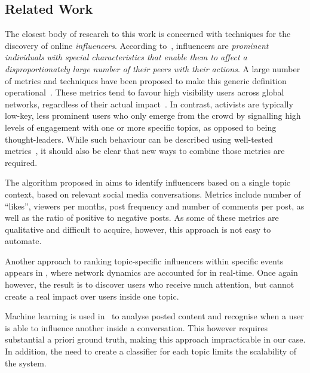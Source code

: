 \subsection{Related Work}  \label{sec:related}

The closest body of research to this work is concerned with techniques for the discovery of online \textit{influencers}. 
According to~\cite{Kardara2015}, influencers are \textit{prominent individuals with special characteristics that enable them to	affect a disproportionately large number of their peers with their actions}.
%
A large number of metrics and techniques have been proposed to make this generic definition operational~\cite{RIQUELME2016949}. 
%
These metrics tend to favour high visibility users across global networks, regardless of their actual impact~\cite{Cha2010MeasuringUI}. 
%
In contrast, activists are typically low-key, less prominent users who only emerge from the crowd by signalling high levels of engagement with one or more specific topics, as opposed to being thought-leaders. 
%
While such behaviour can be described  using well-tested metrics~\cite{RIQUELME2016949}, it should also be clear that new ways to combine those metrics are required.

The algorithm proposed in \cite{MATIC2011} aims to identify influencers based on a single topic context, based on relevant social media conversations.
Metrics include number of ``likes'', viewers per months, post frequency and  number of comments per post, as well as the ratio of positive to negative posts.
As some of these metrics are qualitative and difficult to acquire, however, this approach is not easy to automate.

Another approach to ranking topic-specific influencers within specific events appears in  \cite{Kardara2015}, where network dynamics are accounted for in real-time.
Once again however, the result is to discover users who receive much attention, but cannot create a real impact over users inside one topic.

Machine learning is used in~\cite{Biran2012} to analyse posted content and recognise 
when a user is able to influence another  inside a conversation.
This however requires substantial a priori ground truth, making this approach impracticable in our case. In addition, the need to create a classifier for each topic limits the scalability of the system.

